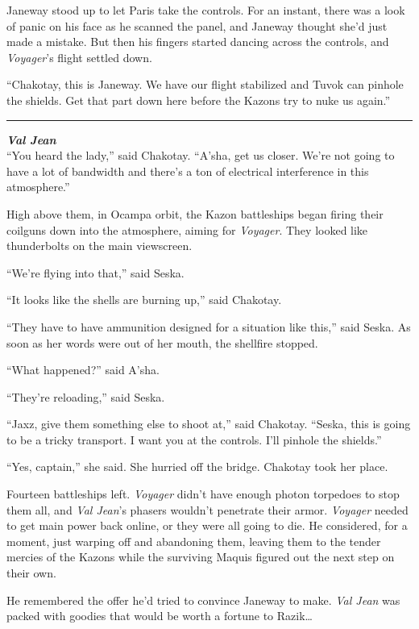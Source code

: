 \documentclass[twoside,letterpaper,12pt]{memoir}
\begin{document}
Janeway stood up to let Paris take the controls. For an instant, there was a look of panic on his face as he scanned the panel, and Janeway thought she'd just made a mistake. But then his fingers started dancing across the controls, and \textit{Voyager}'s flight settled down.

``Chakotay, this is Janeway. We have our flight stabilized and Tuvok can pinhole the shields. Get that part down here before the Kazons try to nuke us again.''

\fancybreak{\rule{3cm}{0.4 pt}}
\noindent\textit{\textbf{Val Jean}}\\

``You heard the lady,'' said Chakotay. ``A'sha, get us closer. We're not going to have a lot of bandwidth and there's a ton of electrical interference in this atmosphere.''

High above them, in Ocampa orbit, the Kazon battleships began firing their coilguns down into the atmosphere, aiming for \textit{Voyager}. They looked like thunderbolts on the main viewscreen.

``We're flying into that,'' said Seska.

``It looks like the shells are burning up,'' said Chakotay.

``They have to have ammunition designed for a situation like this,'' said Seska. As soon as her words were out of her mouth, the shellfire stopped.

``What happened?'' said A'sha.

``They're reloading,'' said Seska.

``Jaxz, give them something else to shoot at,'' said Chakotay. ``Seska, this is going to be a tricky transport. I want you at the controls. I'll pinhole the shields.''

``Yes, captain,'' she said. She hurried off the bridge. Chakotay took her place.

Fourteen battleships left. \textit{Voyager} didn't have enough photon torpedoes to stop them all, and \textit{Val Jean}'s phasers wouldn't penetrate their armor. \textit{Voyager} needed to get main power back online, or they were all going to die. He considered, for a moment, just warping off and abandoning them, leaving them to the tender mercies of the Kazons while the surviving Maquis figured out the next step on their own.

He remembered the offer he'd tried to convince Janeway to make. \textit{Val Jean} was packed with goodies that would be worth a fortune to Razik\ldots 
\end{document}

